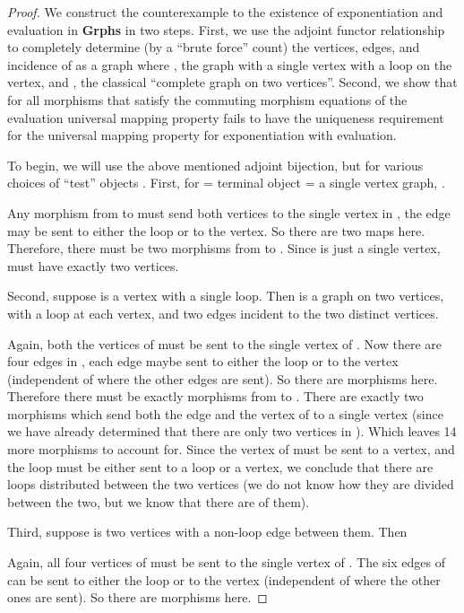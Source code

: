 \documentclass[11pt]{article}
\begin{document}
\begin{proof}
We construct the counterexample to the existence of exponentiation and evaluation in \textbf{Grphs} in two steps. First, we use the adjoint functor relationship to completely determine (by a ``brute force'' count) the vertices, edges, and incidence of  as a graph where , the graph with a single vertex with a loop on the vertex, and , the classical ``complete graph on two vertices''. Second, we show that for all morphisms  that satisfy the commuting morphism equations of the evaluation universal mapping property fails to have the uniqueness requirement for the universal mapping property for exponentiation with evaluation.\par
To begin, we will use the above mentioned adjoint bijection, but for various choices of ``test'' objects . First, for  = terminal object = a single vertex graph, .\par
Any morphism from  to  must send both vertices to the single vertex in , the edge may be sent to either the loop or to the vertex. So there are two maps here. Therefore, there must be two morphisms from  to . Since  is just a single vertex,  must have exactly two vertices.\par
Second, suppose  is a vertex with a single loop. Then  is a graph on two vertices, with a loop at each vertex, and two edges incident to the two distinct vertices.\par
Again, both the vertices of  must be sent to the single vertex of . Now there are four edges in , each edge maybe sent to either the loop or to the vertex (independent of where the other edges are sent). So there are  morphisms here. Therefore there must be exactly  morphisms from  to . There are exactly two morphisms which send both the edge and the vertex of  to a single vertex (since we have already determined that there are only two vertices in ). Which leaves 14 more morphisms to account for. Since the vertex of  must be sent to a vertex, and the loop must be either sent to a loop or a vertex, we conclude that there are  loops distributed between the two vertices (we do not know how they are divided between the two, but we know that there are  of them).\par
Third, suppose  is two vertices with a non-loop edge between them. Then \par
Again, all four vertices of  must be sent to the single vertex of . The six edges of  can be sent to either the loop or to the vertex (independent of where the other ones are sent). So there are  morphisms here.\par

\end{proof}
\end{document}
